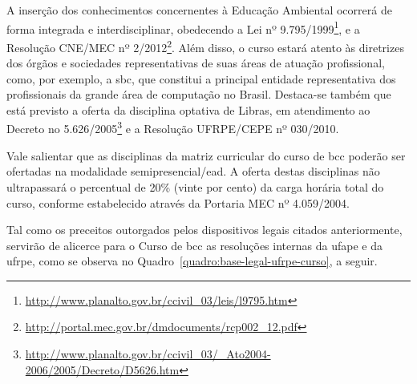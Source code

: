 \documentclass[
	12pt,				%
	openright,			%
  oneside,     %
	a4paper,			%
 hyphens,
	chapter=TITLE,		%
	english,			%
	french,				%
	spanish,			%
	brazil				%
	]{abntex2}
\begin{document}
A inserção dos conhecimentos concernentes à Educação Ambiental ocorrerá de forma integrada e interdisciplinar, obedecendo a Lei nº 9.795/1999\footnote{\url{http://www.planalto.gov.br/ccivil_03/leis/l9795.htm}}, e a Resolução CNE/MEC nº 2/2012\footnote{\url{http://portal.mec.gov.br/dmdocuments/rcp002_12.pdf}}. Além disso, o curso estará atento às diretrizes dos órgãos e sociedades representativas de suas áreas de atuação profissional, como, por exemplo, a \acrshort{sbc}, que constitui a principal entidade representativa dos profissionais da grande área de computação no Brasil. Destaca-se também que está previsto a oferta da disciplina optativa de Libras, em atendimento ao Decreto no 5.626/2005\footnote{\url{http://www.planalto.gov.br/ccivil_03/_Ato2004-2006/2005/Decreto/D5626.htm}} e a Resolução UFRPE/CEPE nº 030/2010.

Vale salientar que as disciplinas da matriz curricular do curso de \acrlong{bcc} poderão ser ofertadas na modalidade semipresencial/\acrshort{ead}. A oferta destas disciplinas não ultrapassará o percentual de 20\% (vinte por cento) da carga horária total do curso, conforme estabelecido através da Portaria MEC nº 4.059/2004.

Tal como os preceitos outorgados pelos dispositivos legais citados anteriormente, servirão de alicerce para o Curso de \acrlong{bcc} as resoluções internas da \acrshort{ufape} e da \acrshort{ufrpe}, como se observa no Quadro~\ref{quadro:base-legal-ufrpe-curso}, a seguir.
\end{document}
